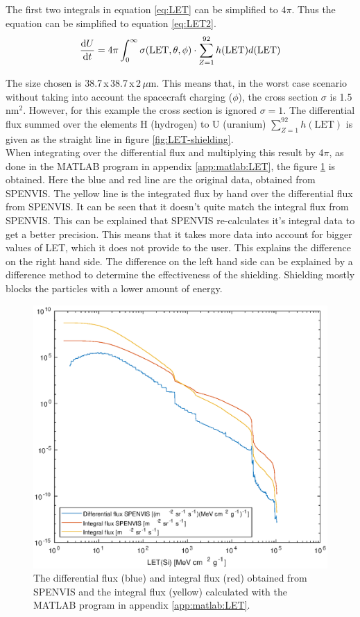 The first two integrals in equation \ref{eq:LET} can be simplified to $4 \pi$. Thus the equation can be simplified to equation \ref{eq:LET2}.
\begin{equation}
\dv{U}{t} = 4 \pi \int^{\infty}_0 \sigma(\text{LET}, \theta, \phi) \cdot \sum^{92}_{Z=1} h(\text{LET}) d(\text{LET})\label{eq:LET2}
\end{equation}

The size chosen is 38.7\,x\,38.7\,x\,2\,$\mu$m. This means that, in the worst case scenario without taking into account the spacecraft charging ($\phi$), the cross section $\sigma$ is 1.5\,nm$^2$. However, for this example the cross section is ignored $\sigma = 1$. The differential flux summed over the elements H (hydrogen) to U (uranium) $\sum^{92}_{Z=1} h(\text{LET})$ is given as the straight line in figure \ref{fig:LET-shielding}.\\

When integrating over the differential flux and multiplying this result by 4$\pi$, as done in the MATLAB program in appendix \ref{app:matlab:LET}, the figure \ref{fig:matlab:LET-shielding} is obtained. Here the blue and red line are the original data, obtained from SPENVIS. The yellow line is the integrated flux by hand over the differential flux from SPENVIS. It can be seen that it doesn't quite match the integral flux from SPENVIS. This can be explained that SPENVIS re-calculates it's integral data to get a better precision. This means that it takes more data into account for bigger values of LET, which it does not provide to the user. This explains the difference on the right hand side. The difference on the left hand side can be explained by a difference method to determine the effectiveness of the shielding. Shielding mostly blocks the particles with a lower amount of energy.

\begin{figure}[H]
\centering
\includegraphics[width=.7\textwidth]{data/LET/LET.eps}
\caption{The differential flux (blue) and integral flux (red) obtained from SPENVIS and the integral flux (yellow) calculated with the MATLAB program in appendix \ref{app:matlab:LET}.}
\label{fig:matlab:LET-shielding}
\end{figure}


